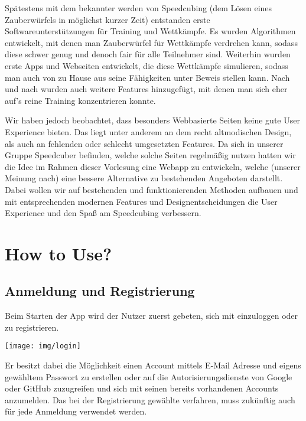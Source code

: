 \documentclass[a4paper]{article}
\theoremstyle{definition}
\begin{document}
Spätestens mit dem bekannter werden von Speedcubing (dem Lösen eines Zauberwürfels in möglichst kurzer Zeit)
entstanden erste Softwareunterstützungen für Training und Wettkämpfe. Es wurden Algorithmen entwickelt, mit denen
man Zauberwürfel für Wettkämpfe verdrehen kann, sodass diese schwer genug und denoch fair für alle Teilnehmer sind.
Weiterhin wurden erste Apps und Webseiten entwickelt, die diese Wettkämpfe simulieren, sodass man auch von zu
Hause aus seine Fähigkeiten unter Beweis stellen kann. Nach und nach wurden auch weitere Features hinzugefügt,
mit denen man sich eher auf's reine Training konzentrieren konnte.

Wir haben jedoch beobachtet, dass besonders Webbasierte Seiten keine gute User Experience bieten. Das liegt
unter anderem an dem recht altmodischen Design, als auch an fehlenden oder schlecht umgesetzten Features.
Da sich in unserer Gruppe Speedcuber befinden, welche solche Seiten regelmäßig nutzen hatten wir die Idee im
Rahmen dieser Vorlesung eine Webapp zu entwickeln, welche (unserer Meinung nach) eine bessere Alternative zu bestehenden
Angeboten darstellt. Dabei wollen wir auf bestehenden und funktionierenden Methoden aufbauen und mit entsprechenden
modernen Features und Designentscheidungen die User Experience und den Spaß am Speedcubing verbessern.

\section{How to Use?}
\subsection*{Anmeldung und Registrierung}
Beim Starten der App wird der Nutzer zuerst gebeten, sich mit einzuloggen oder zu registrieren.
\begin{center}
	\texttt{[image: img/login]}
\end{center}
Er besitzt dabei die Möglichkeit einen Account mittels E-Mail Adresse und eigens gewähltem Passwort zu erstellen oder auf die Autorisierungsdienste von Google oder GitHub zuzugreifen und sich mit seinen bereits vorhandenen Accounts anzumelden. Das bei der Registrierung gewählte verfahren, muss zukünftig auch für jede Anmeldung verwendet werden.
\end{document}

